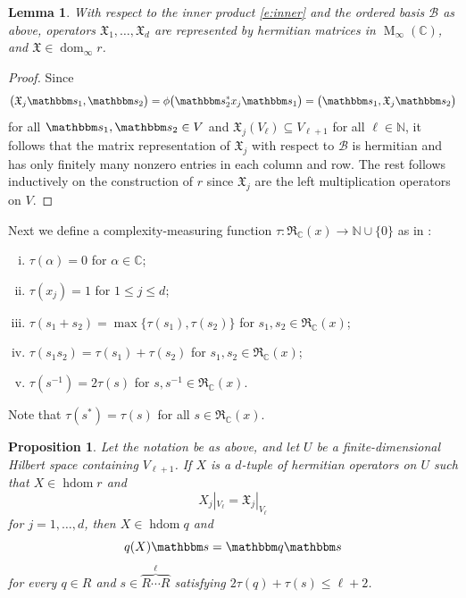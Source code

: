 \documentclass[12pt,a4paper]{amsart}
\DeclareMathOperator{\dom}{dom}
\DeclareMathOperator{\hdom}{hdom}
\DeclareMathOperator{\opm}{M}
\newcommand{\N}{\mathbb{N}}
\newcommand{\C}{\mathbb{C}}
\newcommand{\cB}{\mathcal{B}}
\newcommand{\rs}{\mathbbm s}
\newcommand{\qq}{\mathbbm q}
\newcommand{\fX}{\mathfrak{X}}
\newcommand{\cfm}{\opm_\infty(\C)}
\newcommand{\rex}{\mathfrak{R}_{\C}(x)}
\newtheorem{lem}[thm]{Lemma}
\newtheorem{prop}[thm]{Proposition}
\theoremstyle{definition}
\theoremstyle{remark}
\numberwithin{equation}{section}
\begin{document}
\begin{lem}\label{l:fX}
With respect to the inner product \eqref{e:inner} and the ordered basis $\cB$ as above, operators $\fX_1,\dots,\fX_d$ are represented by hermitian matrices in $\cfm$, and $\fX\in\dom_\infty r$.
\end{lem}

\begin{proof}
Since
$$\big(\fX_j\rs_1,\rs_2\big)
= \phi\big(\rs_2^*x_j\rs_1\big)
= \big( \rs_1,\fX_j\rs_2\big)$$
for all $\rs_1,\rs_2\in V$ and $\fX_j(V_\ell)\subseteq V_{\ell+1}$ for all $\ell\in\N$, it follows that the matrix representation of $\fX_j$ with respect to $\cB$ is hermitian and has only finitely many nonzero entries in each column and row.
The rest follows inductively on the construction of $r$ since 
$\fX_j$ are the left multiplication operators on $V$.
\end{proof}

Next we define a complexity-measuring function $\tau:\rex\to\N\cup\{0\}$ as in \cite[Section 4]{KPV}:
\begin{enumerate}[(i)]
	\item $\tau(\alpha)=0$ for $\alpha\in\C$;
	\item $\tau(x_j)=1$ for $1\le j\le d$;
	\item $\tau(s_1+s_2)=\max\{\tau(s_1),\tau(s_2)\}$ for $s_1,s_2\in\rex$;
	\item $\tau(s_1s_2)=\tau(s_1)+\tau(s_2)$ for $s_1,s_2\in\rex$;
	\item $\tau(s^{-1})=2\tau(s)$ for $s,s^{-1}\in\rex$.
\end{enumerate}
Note that $\tau(s^*)=\tau(s)$ for all $s\in\rex$.

\begin{prop}\label{p:gns}
Let the notation be as above, and let $U$ be a finite-dimensional Hilbert space containing $V_{\ell+1}$. If $X$ is a $d$-tuple of hermitian operators on $U$ such that $X\in\hdom r$ and
$$X_j|_{V_\ell}=\fX_j|_{V_\ell}$$
for $j=1,\dots,d$, then $X\in\hdom q$ and
\begin{equation}\label{e:gns}
q(X)\rs=\qq\rs
\end{equation}
for every $q\in R$ and $s\in \overbrace{R\cdots R}^\ell$ satisfying $2\tau(q)+\tau(s)\le \ell+2$.
\end{prop}
\end{document}
